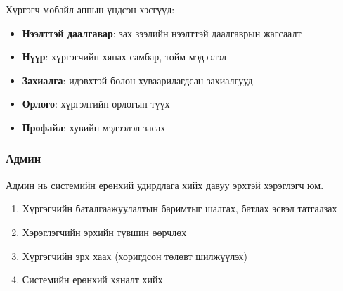 Хүргэгч мобайл аппын үндсэн хэсгүүд:
\begin{itemize}
  \item \textbf{Нээлттэй даалгавар}: зах зээлийн нээлттэй даалгаврын жагсаалт
  \item \textbf{Нүүр}: хүргэгчийн хянах самбар, тойм мэдээлэл
  \item \textbf{Захиалга}: идэвхтэй болон хуваарилагдсан захиалгууд
  \item \textbf{Орлого}: хүргэлтийн орлогын түүх
  \item \textbf{Профайл}: хувийн мэдээлэл засах
\end{itemize}

\subsubsection{Админ}
Админ нь системийн ерөнхий удирдлага хийх давуу эрхтэй хэрэглэгч юм.
\begin{enumerate}
  \item Хүргэгчийн баталгаажуулалтын баримтыг шалгах, батлах эсвэл татгалзах
  \item Хэрэглэгчийн эрхийн түвшин өөрчлөх
  \item Хүргэгчийн эрх хаах (хоригдсон төлөвт шилжүүлэх)
  \item Системийн ерөнхий хяналт хийх
\end{enumerate}


